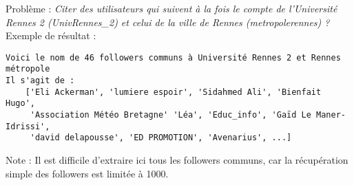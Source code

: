 \documentclass[11pt,a4paper]{article}
\begin{document}
Problème :
\emph{Citer des utilisateurs qui suivent à la fois le compte de l'Université Rennes 2 (UnivRennes\_2) et celui de la ville de Rennes (metropolerennes) ?}
\\

Exemple de résultat :

\begin{verbatim}
Voici le nom de 46 followers communs à Université Rennes 2 et Rennes métropole
Il s'agit de :
    ['Eli Ackerman', 'lumiere espoir', 'Sidahmed Ali', 'Bienfait Hugo',
     'Association Météo Bretagne' 'Léa', 'Educ_info', 'Gaïd Le Maner-Idrissi', 
     'david delapousse', 'ED PROMOTION', 'Avenarius', ...]
\end{verbatim}
Note : Il est difficile d'extraire ici tous les followers communs, car la récupération simple des followers est limitée à 1000.
\end{document}
